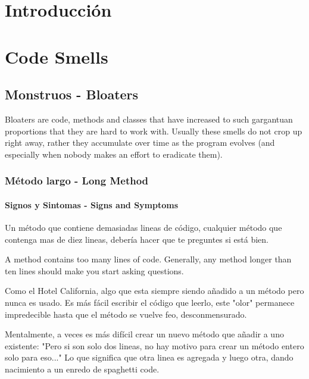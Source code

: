 \documentclass[11pt,a4paper,oneside]{book}
\begin{document}
\tableofcontents %
 
\chapter{Introducción}

\chapter{Code Smells}

\section{Monstruos - Bloaters}

Bloaters are code, methods and classes that have increased to such gargantuan proportions that they are hard to work with. Usually these smells do not crop up right away, rather they accumulate over time as the program evolves (and especially when nobody makes an effort to eradicate them).

\subsection{Método largo -   Long Method}
\subsubsection{Signos y Sintomas - Signs and Symptoms}

Un método que contiene demasiadas lineas de código, cualquier método que contenga mas de diez lineas, debería hacer que te preguntes si está bien.

A method contains too many lines of code. Generally, any method longer than ten lines should make you start asking questions.


Como el Hotel California, algo que esta siempre siendo añadido a un método pero nunca es usado. Es más fácil escribir el código que leerlo, este "olor" permanece impredecible hasta que el método se vuelve feo, desconmensurado. 

Mentalmente, a veces es más difícil crear un nuevo método que añadir a uno existente: "Pero si son solo dos lineas, no hay motivo para crear un método entero solo para eso..." Lo que significa que otra linea es agregada y luego otra, dando nacimiento a un enredo de spaghetti code. 
\end{document}
